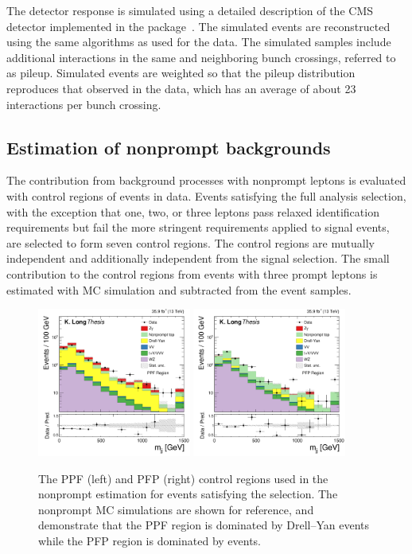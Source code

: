 The detector response is simulated using a detailed
description of the CMS detector implemented in the \GEANTfour
package~\cite{GEANT, Geant2}. The simulated events are  reconstructed
using the same algorithms as used for the data. 
The simulated samples include additional interactions in the same and neighboring bunch crossings,
referred to as pileup.
Simulated events are weighted so that the pileup distribution reproduces that observed in 
the data, which has an average of about 23 interactions per bunch
crossing.

\subsection{Estimation of nonprompt backgrounds}

The contribution from background processes with nonprompt leptons is
evaluated with control regions of events in data.
Events satisfying the full analysis selection,
with the exception that one, two, or three leptons pass relaxed identification
requirements but fail the more stringent requirements applied to signal events,
are selected to form seven control regions. The control regions are
mutually independent and additionally independent from the signal selection.
The small contribution to the control regions from events with three prompt leptons
is estimated with MC simulation and 
subtracted from the event samples.

\begin{figure}[htbp]
  \centering
   \includegraphics[width=0.45\textwidth]{figures/AnalysisProcedure/mjj_PPF.pdf}
   \includegraphics[width=0.45\textwidth]{figures/AnalysisProcedure/mjj_PFP.pdf}
  \caption{
    The PPF (left) and PFP (right) control regions used in the nonprompt estimation
    for events satisfying the \WZjj selection.
    The nonprompt MC simulations are shown for reference, and demonstrate that the
    PPF region is dominated by Drell--Yan events while the PFP region
    is dominated by {\ttbar} events.
        }
 \label{fig:nonpromptBackgroundCRs}
\end{figure}

